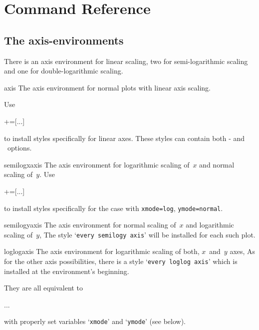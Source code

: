 
\section{Command Reference}
\subsection{The axis-environments}
There is an axis environment for linear scaling, two for semi-logarithmic scaling and one for double-logarithmic scaling.
\begin{environment}{{axis}}
	The axis environment for normal plots with linear axis scaling.

	Use
\begin{codeexample}
+=[...]
\end{codeexample}
to install styles specifically for linear axes. These styles can contain both \Tikz- and \PGFPlots\ options.
\end{environment}

\begin{environment}{{semilogxaxis}}
The axis environment for logarithmic scaling of~$x$ and normal scaling of~$y$.
Use
\begin{codeexample}
+=[...]
\end{codeexample}
to install styles specifically for the case with \texttt{xmode=log}, \texttt{ymode=normal}.
\end{environment}

\begin{environment}{{semilogyaxis}}
The axis environment for normal scaling of~$x$ and logarithmic scaling of~$y$,
The style `\texttt{every semilogy axis}' will be installed for each such plot.
\end{environment}

\begin{environment}{{loglogaxis}}
The axis environment for logarithmic scaling of both, $x$~and~$y$ axes,
As for the other axis possibilities, there is a style `\texttt{every loglog axis}' which is installed at the environment's beginning.
\end{environment}

They are all equivalent to
\begin{codeexample}
\begin{axis}[
	xmode=log|normal,
	ymode=log|normal]
...
\end{axis}
\end{codeexample}
with properly set variables `\texttt{xmode}' and `\texttt{ymode}' (see below).

